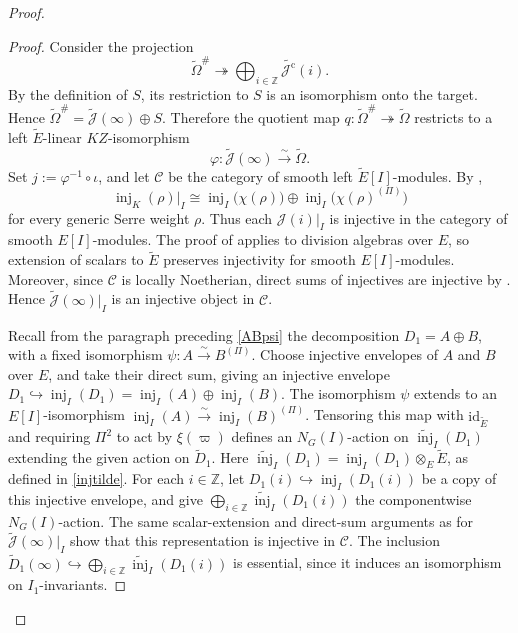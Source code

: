 \documentclass[a4paper,10pt,twoside]{amsart}
\theoremstyle{definition}
\numberwithin{equation}{section}
\begin{document}
\begin{proof}
\begin{proof}
Consider the projection
$$
\widetilde\Omega^\#
\twoheadrightarrow
\bigoplus_{i\in\mathbb Z}\widetilde{\mathcal J^{\mathrm c}}(i).
$$
By the definition of \(S\), its restriction to
\(S\) is an isomorphism onto the target. Hence $\widetilde\Omega^\#
=\widetilde{\mathcal J}(\infty)\oplus S$. Therefore the quotient map
\(q:\widetilde\Omega^\#\twoheadrightarrow\widetilde\Omega\)
restricts to a left \(\widetilde E\)-linear \(KZ\)-isomorphism
$$
\varphi:\widetilde{\mathcal J}(\infty)
\xrightarrow{\sim}\widetilde\Omega.
$$
Set \(j:=\varphi^{-1}\circ\iota\), and let \(\mathscr C\) be the
category of smooth left \(\widetilde E[I]\)-modules.
By \cite[Corollary~6.4 and Lemma~6.8]{Bre07},
\begin{equation}\label{injective-restriction-to-I}
\operatorname{inj}_K(\rho)|_I
\cong
\operatorname{inj}_I\bigl(\chi(\rho)\bigr)
\oplus
\operatorname{inj}_I\bigl(\chi(\rho)^{(\Pi)}\bigr)
\end{equation}
for every generic Serre weight \(\rho\).
Thus each \(\mathcal J(i)|_I\) is injective in the category of smooth $E[I]$-modules. The proof of \cite[Lemma~5.29]{Pas13} applies to division algebras over \(E\), so extension of scalars to $\widetilde E$ preserves injectivity
for smooth \(E[I]\)-modules.
Moreover, since \(\mathscr C\) is locally Noetherian, direct
sums of injectives are injective by
\cite[Proposition~A.1.1(2)]{DEG}.
Hence \(\widetilde{\mathcal J}(\infty)|_I\) is an injective object in \(\mathscr C\).

Recall from the paragraph preceding \eqref{ABpsi} the
decomposition \(D_1=A\oplus B\), with a fixed isomorphism
\(\psi:A\xrightarrow{\sim}B^{(\Pi)}\).
Choose injective envelopes of \(A\) and \(B\) over \(E\),
and take their direct sum, giving an injective envelope
\(D_1\hookrightarrow\operatorname{inj}_I(D_1)
=\operatorname{inj}_I(A)\oplus\operatorname{inj}_I(B)\).
The isomorphism \(\psi\) extends to an \(E[I]\)-isomorphism
\(\operatorname{inj}_I(A)\xrightarrow{\sim}
\operatorname{inj}_I(B)^{(\Pi)}\).
Tensoring this map with \(\mathrm{id}_{\widetilde E}\) and
requiring \(\Pi^2\) to act by \(\xi(\varpi)\) defines an
\(N_G(I)\)-action on \(\widetilde{\operatorname{inj}}_I(D_1)\)
extending the given action on \(\widetilde D_1\). Here \(\widetilde{\operatorname{inj}}_I(D_1)
=\operatorname{inj}_I(D_1)\otimes_E\widetilde E\),
as defined in \eqref{injtilde}. For each \(i\in\mathbb Z\), let
\(D_1(i)\hookrightarrow\operatorname{inj}_I(D_1(i))\)
be a copy of this injective envelope, and give
\(\bigoplus_{i\in\mathbb Z}
\widetilde{\operatorname{inj}}_I(D_1(i))\)
the componentwise \(N_G(I)\)-action.
The same scalar-extension and direct-sum arguments as for \(\widetilde{\mathcal J}(\infty)|_I\) show that this representation is injective in \(\mathscr C\).
The inclusion
\(\widetilde D_1(\infty)\hookrightarrow
\bigoplus_{i\in\mathbb Z}
\widetilde{\operatorname{inj}}_I(D_1(i))\)
is essential, since it induces an isomorphism on
\(I_1\)-invariants.


\end{proof}
\end{proof}
\end{document}
